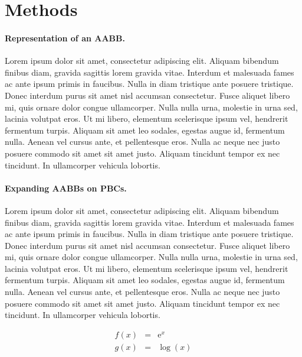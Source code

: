\documentclass[10pt,letterpaper,twocolumn]{article}
\begin{document}
\section*{Methods}

\paragraph{Representation of an AABB.}
Lorem ipsum dolor sit amet, consectetur adipiscing elit. Aliquam bibendum
finibus diam, gravida sagittis lorem gravida vitae. Interdum et malesuada fames
ac ante ipsum primis in faucibus. Nulla in diam tristique ante posuere
tristique. Donec interdum purus sit amet nisl accumsan consectetur. Fusce
aliquet libero mi, quis ornare dolor congue ullamcorper. Nulla nulla urna,
molestie in urna sed, lacinia volutpat eros. Ut mi libero, elementum scelerisque
ipsum vel, hendrerit fermentum turpis. Aliquam sit amet leo sodales, egestas
augue id, fermentum nulla. Aenean vel cursus ante, et pellentesque eros. Nulla
ac neque nec justo posuere commodo sit amet sit amet justo. Aliquam tincidunt
tempor ex nec tincidunt. In ullamcorper vehicula lobortis.

\paragraph{Expanding AABBs on PBCs.}
Lorem ipsum dolor sit amet, consectetur adipiscing elit. Aliquam bibendum
finibus diam, gravida sagittis lorem gravida vitae. Interdum et malesuada fames
ac ante ipsum primis in faucibus. Nulla in diam tristique ante posuere
tristique. Donec interdum purus sit amet nisl accumsan consectetur. Fusce
aliquet libero mi, quis ornare dolor congue ullamcorper. Nulla nulla urna,
molestie in urna sed, lacinia volutpat eros. Ut mi libero, elementum scelerisque
ipsum vel, hendrerit fermentum turpis. Aliquam sit amet leo sodales, egestas
augue id, fermentum nulla. Aenean vel cursus ante, et pellentesque eros. Nulla
ac neque nec justo posuere commodo sit amet sit amet justo. Aliquam tincidunt
tempor ex nec tincidunt. In ullamcorper vehicula lobortis.

\begin{eqnarray}
    f(x) &=& \mathrm{e}^x \nonumber\\
    g(x) &=& \log(x)      \nonumber
\end{eqnarray}
\end{document}
